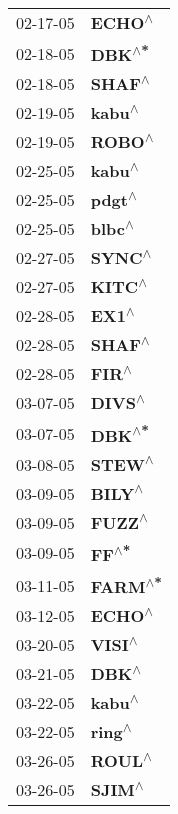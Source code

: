 \begin{supertabular}{p{0.08\textwidth}p{0.2\textwidth}}
 02-17-05 &    \textbf{ECHO\textsuperscript{$\wedge$}} \\
 02-18-05 &    \textbf{DBK\textsuperscript{$\wedge$*}} \\
 02-18-05 &    \textbf{SHAF\textsuperscript{$\wedge$}} \\
 02-19-05 &    \textbf{kabu\textsuperscript{$\wedge$}} \\
 02-19-05 &    \textbf{ROBO\textsuperscript{$\wedge$}} \\
 02-25-05 &    \textbf{kabu\textsuperscript{$\wedge$}} \\
 02-25-05 &    \textbf{pdgt\textsuperscript{$\wedge$}} \\
 02-25-05 &    \textbf{blbc\textsuperscript{$\wedge$}} \\
 02-27-05 &    \textbf{SYNC\textsuperscript{$\wedge$}} \\
 02-27-05 &    \textbf{KITC\textsuperscript{$\wedge$}} \\
 02-28-05 &     \textbf{EX1\textsuperscript{$\wedge$}} \\
 02-28-05 &    \textbf{SHAF\textsuperscript{$\wedge$}} \\
 02-28-05 &     \textbf{FIR\textsuperscript{$\wedge$}} \\
 03-07-05 &    \textbf{DIVS\textsuperscript{$\wedge$}} \\
 03-07-05 &    \textbf{DBK\textsuperscript{$\wedge$*}} \\
 03-08-05 &    \textbf{STEW\textsuperscript{$\wedge$}} \\
 03-09-05 &    \textbf{BILY\textsuperscript{$\wedge$}} \\
 03-09-05 &    \textbf{FUZZ\textsuperscript{$\wedge$}} \\
 03-09-05 &     \textbf{FF\textsuperscript{$\wedge$*}} \\
 03-11-05 &   \textbf{FARM\textsuperscript{$\wedge$*}} \\
 03-12-05 &    \textbf{ECHO\textsuperscript{$\wedge$}} \\
 03-20-05 &    \textbf{VISI\textsuperscript{$\wedge$}} \\
 03-21-05 &     \textbf{DBK\textsuperscript{$\wedge$}} \\
 03-22-05 &    \textbf{kabu\textsuperscript{$\wedge$}} \\
 03-22-05 &    \textbf{ring\textsuperscript{$\wedge$}} \\
 03-26-05 &    \textbf{ROUL\textsuperscript{$\wedge$}} \\
 03-26-05 &    \textbf{SJIM\textsuperscript{$\wedge$}} \\

\end{supertabular}
